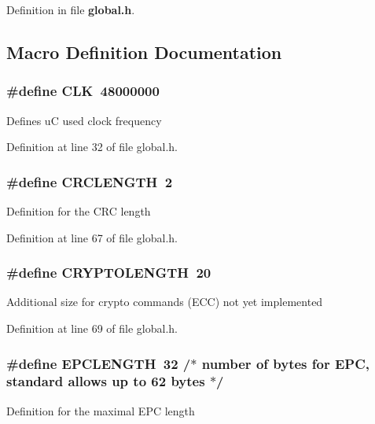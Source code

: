 Definition in file {\bf global.\-h}.



\subsection{Macro Definition Documentation}
\subsubsection[{C\-L\-K}]{\setlength{\rightskip}{0pt plus 5cm}\#define C\-L\-K~48000000}\label{global_8h_a4b355291fe6b8ba8e167ab0faa862e45}
Defines u\-C used clock frequency 

Definition at line 32 of file global.\-h.

\subsubsection[{C\-R\-C\-L\-E\-N\-G\-T\-H}]{\setlength{\rightskip}{0pt plus 5cm}\#define C\-R\-C\-L\-E\-N\-G\-T\-H~2}\label{global_8h_ad197f7891e6d4ba60f795bb3c32df2ab}
Definition for the C\-R\-C length 

Definition at line 67 of file global.\-h.

\subsubsection[{C\-R\-Y\-P\-T\-O\-L\-E\-N\-G\-T\-H}]{\setlength{\rightskip}{0pt plus 5cm}\#define C\-R\-Y\-P\-T\-O\-L\-E\-N\-G\-T\-H~20}\label{global_8h_a97acaf577020010560fee3e0c94574a8}
Additional size for crypto commands (E\-C\-C) not yet implemented 

Definition at line 69 of file global.\-h.

\subsubsection[{E\-P\-C\-L\-E\-N\-G\-T\-H}]{\setlength{\rightskip}{0pt plus 5cm}\#define E\-P\-C\-L\-E\-N\-G\-T\-H~32  /$\ast$ number of bytes for E\-P\-C, standard allows up to 62 bytes $\ast$/}\label{global_8h_a81cf63c63ff9c5236c24a0ceea9e90fd}
Definition for the maximal E\-P\-C length 

